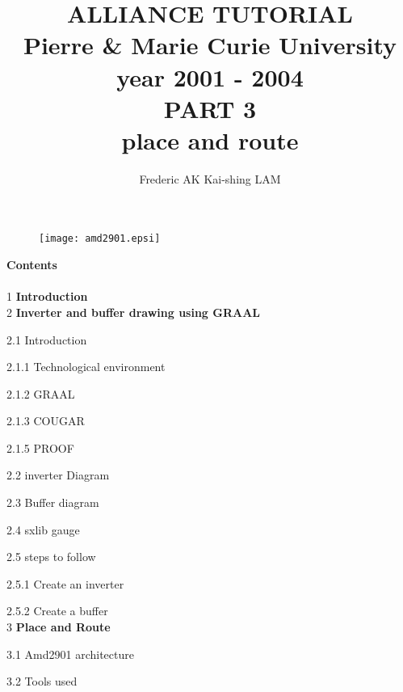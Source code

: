 \documentclass[12pt]{article}
\begin{document}
\title{
               {\Huge ALLIANCE TUTORIAL \\}
    {\large
               Pierre \& Marie Curie University \\
                    year 2001 - 2004\\
    }
    \vspace{1cm}
    {\huge
                      PART 3\\
    		place and route
    }
}
\date{}
\author{
              Frederic AK\hspace{2cm} Kai-shing LAM
}

\maketitle
\begin{figure}[H]\centering
  \texttt{[image: amd2901.epsi]}
\end{figure}

\thispagestyle{empty}
\def\myfbox#1{\vspace*{3mm}\fbox{#1}\vspace{3mm}}
\newpage
{\bf Contents}\\
\\
{1} {\bf Introduction}
\\
{2 }{\bf Inverter and buffer drawing using GRAAL}

{2.1} Introduction

\hspace{0.5cm} {2.1.1} Technological environment

\hspace{0.5cm} {2.1.2} GRAAL

\hspace{0.5cm} {2.1.3} COUGAR

\hspace{0.5cm} {2.1.5} PROOF

{2.2} inverter Diagram

{2.3} Buffer diagram 

{2.4} sxlib gauge

{2.5} steps to follow

\hspace{0.5cm}  {2.5.1} Create an inverter

\hspace{0.5cm}  {2.5.2} Create a buffer
\\
{3} {\bf Place and Route}

{3.1} Amd2901 architecture

{3.2} Tools used
\end{document}
